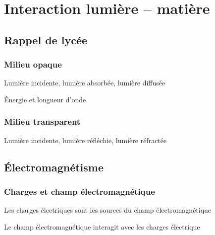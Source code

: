 \chapter{Interaction lumière -- matière}

\section{Rappel de lycée}
\subsection{Milieu opaque}
Lumière incidente, lumière absorbée, lumière diffusée

Énergie et longueur d'onde

\subsection{Milieu transparent}
Lumière incidente, lumière réfléchie, lumière réfractée

\subsection{}


\section{Électromagnétisme}
\subsection{Charges et champ électromagnétique}

Les charges électriques sont les sources du champ électromagnétique

Le champ électromagnétique interagit avec les charges électrique

\subsection{}


\subsection{}




\subsection{}



\begin{center}
\end{center}


\subsection{}
\begin{center}
\end{center}

